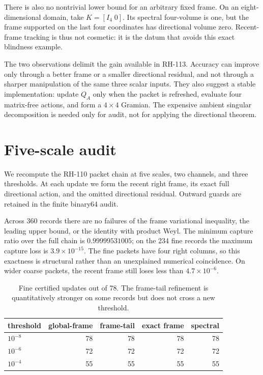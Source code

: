\documentclass[12pt]{article}
\begin{document}
There is also no nontrivial lower bound for an arbitrary fixed frame.  On an
eight-dimensional domain, take $K=[I_4\;0]$.  Its spectral four-volume is one,
but the frame supported on the last four coordinates has directional volume
zero.  Recent-frame tracking is thus not cosmetic: it is the datum that
avoids this exact blindness example.

The two observations delimit the gain available in RH-113.  Accuracy can
improve only through a better frame or a smaller directional residual, and
not through a sharper manipulation of the same three scalar inputs.  They
also suggest a stable implementation: update $Q_A$ only when the packet is
refreshed, evaluate four matrix-free actions, and form a $4\times4$ Gramian.
The expensive ambient singular decomposition is needed only for audit, not
for applying the directional theorem.

\section{Five-scale audit}
We recompute the RH-110 packet chain at five scales, two channels, and three
thresholds.  At each update we form the recent right frame, its exact full
directional action, and the omitted directional residual.  Outward guards
are retained in the finite binary64 audit.

Across 360 records there are no failures of the frame variational inequality,
the leading upper bound, or the identity with product Weyl.  The minimum
capture ratio over the full chain is $0.99999531005$; on the 234 fine records
the maximum capture loss is $3.9\times10^{-15}$.  The fine packets have four
right columns, so this exactness is structural rather than an unexplained
numerical coincidence.  On wider coarse packets, the recent frame still
loses less than $4.7\times10^{-6}$.

\begin{table}[h]
\centering\begin{tabular}{lrrrr}\toprule
threshold & global-frame & frame-tail & exact frame & spectral\\\midrule
$10^{-8}$&78&78&78&78\\
$10^{-6}$&72&72&72&72\\
$10^{-4}$&55&55&55&55\\\bottomrule
\end{tabular}
\caption{Fine certified updates out of 78.  The frame-tail refinement is
quantitatively stronger on some records but does not cross a new threshold.}
\end{table}
\end{document}
